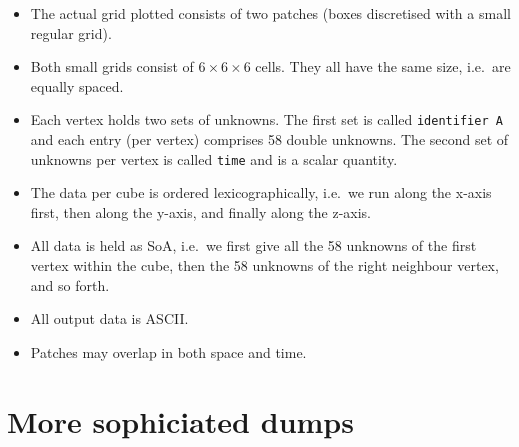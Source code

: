 \begin{itemize}
  \item The actual grid plotted consists of two patches (boxes discretised with
  a small regular grid).
  \item Both small grids consist of $6 \times 6 \times 6$ cells. They all have
  the same size, i.e.~are equally spaced. 
  \item Each vertex holds two sets of unknowns. The first set is called
  \texttt{identifier A} and each entry (per vertex) comprises 58 double
  unknowns. The second set of unknowns per vertex is called \texttt{time} and is
  a scalar quantity.
  \item The data per cube is ordered lexicographically, i.e.~we run along the
  x-axis first, then along the y-axis, and finally along the z-axis. 
  \item All data is held as SoA, i.e.~we first give all the 58 unknowns of the
  first vertex within the cube, then the 58 unknowns of the right neighbour
  vertex, and so forth.
  \item All output data is ASCII.
  \item Patches may overlap in both space and time.
\end{itemize}




\section{More sophiciated dumps}

